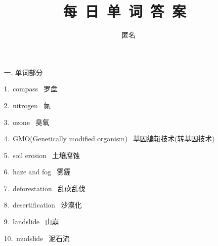 \documentclass[a4paper, 12pt]{article}
\begin{document}
    \noindent

    \title{ 每\ 日\ 单\ 词\ 答\ 案\  }
    \author{ 匿名 }
    \maketitle

\begin{flushleft}
一. 单词部分
\end{flushleft}

\begin{multicols}{2}
\begin{flushleft}
1.\ compass \ 罗盘
\end{flushleft}

\begin{flushleft}
2.\ nitrogen \ 氮
\end{flushleft}
\end{multicols}

\begin{multicols}{2}
\begin{flushleft}
3.\ ozone \ 臭氧
\end{flushleft}

\begin{flushleft}
4.\ GMO(Genetically modified organism) \ 基因编辑技术(转基因技术)
\end{flushleft}
\end{multicols}

\begin{multicols}{2}
\begin{flushleft}
5.\ soil erosion \ 土壤腐蚀
\end{flushleft}

\begin{flushleft}
6.\ haze and fog \ 雾霾
\end{flushleft}
\end{multicols}

\begin{multicols}{2}
\begin{flushleft}
7.\ deforestation \ 乱砍乱伐
\end{flushleft}

\begin{flushleft}
8.\ desertification \ 沙漠化
\end{flushleft}
\end{multicols}

\begin{multicols}{2}
\begin{flushleft}
9.\ landslide \ 山崩
\end{flushleft}

\begin{flushleft}
10.\ mudslide \ 泥石流
\end{flushleft}
\end{multicols}
\end{document}
